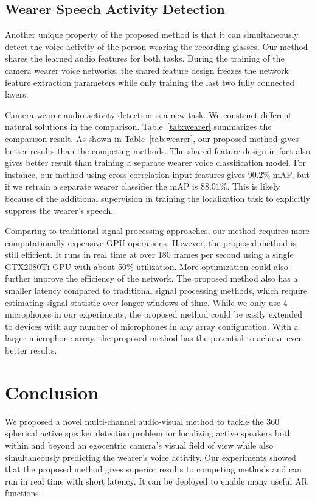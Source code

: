 \documentclass[10pt,twocolumn,letterpaper]{article}
\begin{document}
\vspace{-5pt}
\subsection{Wearer Speech Activity Detection}
\vspace{-5pt}
Another unique property of the proposed method is that it can simultaneously detect the voice activity of the person wearing the recording glasses. 
Our method shares the learned audio 
features for both tasks. During the training of the camera wearer voice networks, 
the shared feature design freezes the network feature extraction parameters while only training the last two fully connected layers.

Camera wearer audio activity detection is a new task. We construct different natural solutions in the comparison.
Table~\ref{tab:wearer} summarizes the comparison result.
As shown in Table~\ref{tab:wearer}, our proposed method gives better results than the competing methods.
The shared feature design in fact also gives better result than training a separate wearer voice classification model.
For instance, our method using cross correlation input features gives 90.2\% mAP, but if we retrain a separate wearer classifier 
the mAP is 88.01\%.
This is likely because of the additional supervision in training the localization task to explicitly suppress the wearer's speech. 


Comparing to traditional signal processing approaches, our method requires more computationally expensive GPU operations.
However, the proposed method is still efficient. It runs in real time at over 180 frames per second using a single GTX2080Ti GPU with about 50\% utilization. More optimization could also further improve
the efficiency of the network. The proposed method also has a smaller latency compared to traditional signal processing methods, 
which require estimating signal statistic over longer windows of time.
While we only use 4 microphones in our experiments, the proposed method could be easily extended to devices with any number of microphones 
in any array configuration. With a larger microphone array, the proposed method has the potential to achieve even better results. 



\vspace{-5pt}
\section{Conclusion}
\vspace{-5pt}
We proposed a novel multi-channel audio-visual method to tackle the 360 spherical active speaker detection problem
for localizing active speakers both within and beyond an egocentric camera's visual field of view while also simultaneously predicting
the wearer's voice activity. 
Our experiments showed that the proposed method gives superior results to competing methods
and can run in real time with short latency. It can be deployed to enable many useful AR functions. 
\end{document}
